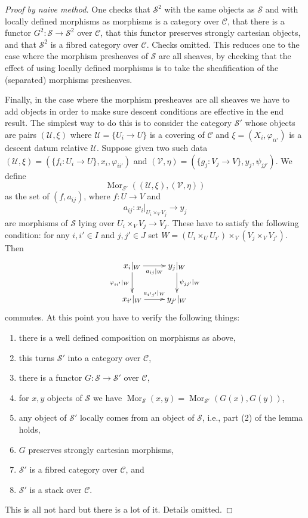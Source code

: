 \documentclass{stacks-project}
\theoremstyle{plain}
\theoremstyle{definition}
\theoremstyle{remark}
\numberwithin{equation}{subsection}
\def\Mor{\mathop{\mathrm{Mor}}\nolimits}
\begin{document}
\begin{proof}[Proof by naive method]
\medskip\noindent
One checks that $\mathcal{S}^2$ with the same objects as
$\mathcal{S}$ and with locally defined morphisms as morphisms
is a category over $\mathcal{C}$, that there is a functor
$G^2 : \mathcal{S} \to \mathcal{S}^2$ over $\mathcal{C}$,
that this functor preserves strongly cartesian objects,
and that $\mathcal{S}^2$ is a fibred category over $\mathcal{C}$.
Checks omitted. This reduces one to the case where the
morphism presheaves of $\mathcal{S}$ are all sheaves, by
checking that the effect of using locally defined morphisms
is to take the sheafification of the (separated) morphisms
presheaves.

\medskip\noindent
Finally, in the case where the morphism presheaves are all sheaves
we have to add objects in order to make sure descent conditions are
effective in the end result. The simplest way to do this is to
consider the category $\mathcal{S}'$ whose objects are
pairs $(\mathcal{U}, \xi)$ where
$\mathcal{U} = \{U_i \to U\}$ is a covering of $\mathcal{C}$ and
$\xi = (X_i, \varphi_{ii'})$ is a descent datum relative $\mathcal{U}$.
Suppose given two such data
$(\mathcal{U}, \xi) = (\{f_i : U_i \to U\},  x_i, \varphi_{ii'})$ and
$(\mathcal{V}, \eta) = (\{g_j : V_j \to V\},  y_j, \psi_{jj'})$.
We define
$$
\Mor_{\mathcal{S}'}((\mathcal{U}, \xi), (\mathcal{V}, \eta))
$$
as the set of $(f, a_{ij})$, where $f : U \to V$ and
$$
a_{ij} :
x_i|_{U_i \times_V V_j}
\longrightarrow
y_j
$$
are morphisms of $\mathcal{S}$ lying over $U_i \times_V V_j \to V_j$.
These have to satisfy the following condition: for any
$i, i' \in I$ and $j, j' \in J$ set
$W = (U_i \times_U U_{i'}) \times_V (V_j \times_V V_{j'})$. Then
$$
\xymatrix{
x_i|_W \ar[r]_{a_{ij}|_W} \ar[d]_{\varphi_{ii'}|_W} &
y_j|_W \ar[d]^{\psi_{jj'}|_W} \\
x_{i'}|_W \ar[r]^{a_{i'j'}|_W} &
y_{j'}|_W
}
$$
commutes. At this point you have to verify the following things:
\begin{enumerate}
\item there is a well defined composition on morphisms as above,
\item this turns $\mathcal{S}'$ into a category over $\mathcal{C}$,
\item there is a functor $G : \mathcal{S} \to \mathcal{S}'$ over $\mathcal{C}$,
\item for $x, y$ objects of $\mathcal{S}$ we have
$\Mor_\mathcal{S}(x, y) = \Mor_{\mathcal{S}'}(G(x), G(y))$,
\item any object of $\mathcal{S}'$ locally comes from an object of
$\mathcal{S}$, i.e., part (2) of the lemma holds,
\item $G$ preserves strongly cartesian morphisms,
\item $\mathcal{S}'$ is a fibred category over $\mathcal{C}$, and
\item $\mathcal{S}'$ is a stack over $\mathcal{C}$.
\end{enumerate}
This is all not hard but there is a lot of it. Details omitted.
\end{proof}
\end{document}
